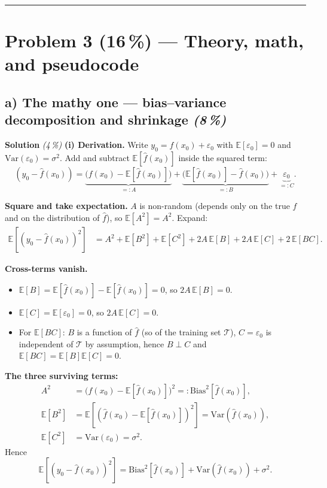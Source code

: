 \documentclass[11pt,a4paper]{article}
\newcommand{\points}[1]{\textbf{(#1\,\%)}}
\newcommand{\subpoints}[1]{\textit{(#1\,\%)}}
\newcommand{\sol}{\noindent\textbf{Solution}}
\begin{document}
\vspace{0.6em}
\hrule
\vspace{1em}

\section*{Problem 3 \points{16} --- Theory, math, and pseudocode}

\subsection*{a) The mathy one --- bias--variance decomposition and shrinkage \subpoints{8}}

\sol{} \subpoints{4} \textbf{(i) Derivation.} Write $y_0 = f(x_0) + \varepsilon_0$ with
$\mathbb{E}[\varepsilon_0]=0$ and $\mathrm{Var}(\varepsilon_0)=\sigma^2$. Add and subtract
$\mathbb{E}[\hat f(x_0)]$ inside the squared term:
$$(y_0 - \hat f(x_0))
   = \underbrace{\bigl(f(x_0) - \mathbb{E}[\hat f(x_0)]\bigr)}_{=:A}
   + \underbrace{\bigl(\mathbb{E}[\hat f(x_0)] - \hat f(x_0)\bigr)}_{=:B}
   + \underbrace{\varepsilon_0}_{=:C}.$$

\textbf{Square and take expectation.} $A$ is non-random (depends only on the true $f$ and on the
distribution of $\hat f$), so $\mathbb{E}[A^2] = A^2$. Expand:
\begin{align*}
\mathbb{E}[(y_0-\hat f(x_0))^2]
&= A^2 + \mathbb{E}[B^2] + \mathbb{E}[C^2] + 2A\,\mathbb{E}[B] + 2A\,\mathbb{E}[C] + 2\,\mathbb{E}[BC].
\end{align*}

\textbf{Cross-terms vanish.}
\begin{itemize}
  \item $\mathbb{E}[B] = \mathbb{E}[\hat f(x_0)] - \mathbb{E}[\hat f(x_0)] = 0$, so $2A\,\mathbb{E}[B]=0$.
  \item $\mathbb{E}[C] = \mathbb{E}[\varepsilon_0] = 0$, so $2A\,\mathbb{E}[C]=0$.
  \item For $\mathbb{E}[BC]$: $B$ is a function of $\hat f$ (so of the training set $\mathcal T$),
        $C=\varepsilon_0$ is independent of $\mathcal T$ by assumption, hence $B\perp C$ and
        $\mathbb{E}[BC]=\mathbb{E}[B]\mathbb{E}[C]=0$.
\end{itemize}

\textbf{The three surviving terms:}
\begin{align*}
A^2 &= \bigl(f(x_0)-\mathbb{E}[\hat f(x_0)]\bigr)^2 =: \mathrm{Bias}^2[\hat f(x_0)], \\
\mathbb{E}[B^2] &= \mathbb{E}\!\left[(\hat f(x_0)-\mathbb{E}[\hat f(x_0)])^2\right] = \mathrm{Var}(\hat f(x_0)), \\
\mathbb{E}[C^2] &= \mathrm{Var}(\varepsilon_0) = \sigma^2.
\end{align*}
Hence
$$\boxed{\;\mathbb{E}\!\left[(y_0-\hat f(x_0))^2\right]
   = \mathrm{Bias}^2[\hat f(x_0)] + \mathrm{Var}(\hat f(x_0)) + \sigma^2.\;}$$
\end{document}
